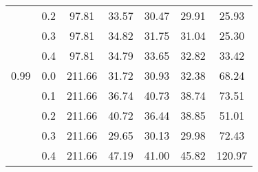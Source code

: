 \begin{table}
\begin{tabular}{ll|ccccc}
                     &0.2 &97.81 &33.57 &30.47 &29.91 &25.93 \\
                     &0.3 &97.81 &34.82 &31.75 &31.04 &25.30 \\
                     &0.4 &97.81 &34.79 &33.65 &32.82 &33.42 \\
                0.99 &0.0 &211.66 &31.72 &30.93 &32.38 &68.24 \\
                     &0.1 &211.66 &36.74 &40.73 &38.74 &73.51 \\
                     &0.2 &211.66 &40.72 &36.44 &38.85 &51.01 \\
                     &0.3 &211.66 &29.65 &30.13 &29.98 &72.43 \\
                     &0.4 &211.66 &47.19 &41.00 &45.82 &120.97 \\
                \bottomrule
                \end{tabular}                
        \end{table}
        

